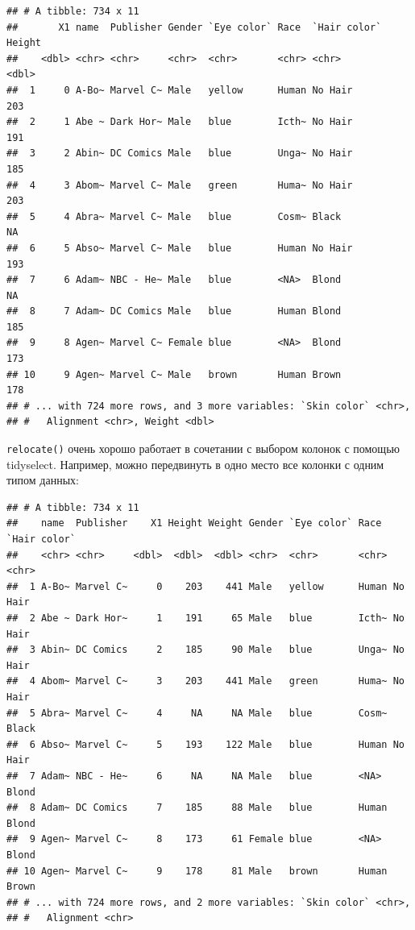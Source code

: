 \documentclass[
]{book}
\newenvironment{Shaded}{\begin{snugshade}}{\end{snugshade}}
\newcommand{\DataTypeTok}[1]{\textcolor[rgb]{0.13,0.29,0.53}{#1}}
\newcommand{\KeywordTok}[1]{\textcolor[rgb]{0.13,0.29,0.53}{\textbf{#1}}}
\newcommand{\NormalTok}[1]{#1}
\newcommand{\OperatorTok}[1]{\textcolor[rgb]{0.81,0.36,0.00}{\textbf{#1}}}
\newcommand{\StringTok}[1]{\textcolor[rgb]{0.31,0.60,0.02}{#1}}
\begin{document}
\begin{verbatim}
## # A tibble: 734 x 11
##       X1 name  Publisher Gender `Eye color` Race  `Hair color` Height
##    <dbl> <chr> <chr>     <chr>  <chr>       <chr> <chr>         <dbl>
##  1     0 A-Bo~ Marvel C~ Male   yellow      Human No Hair         203
##  2     1 Abe ~ Dark Hor~ Male   blue        Icth~ No Hair         191
##  3     2 Abin~ DC Comics Male   blue        Unga~ No Hair         185
##  4     3 Abom~ Marvel C~ Male   green       Huma~ No Hair         203
##  5     4 Abra~ Marvel C~ Male   blue        Cosm~ Black            NA
##  6     5 Abso~ Marvel C~ Male   blue        Human No Hair         193
##  7     6 Adam~ NBC - He~ Male   blue        <NA>  Blond            NA
##  8     7 Adam~ DC Comics Male   blue        Human Blond           185
##  9     8 Agen~ Marvel C~ Female blue        <NA>  Blond           173
## 10     9 Agen~ Marvel C~ Male   brown       Human Brown           178
## # ... with 724 more rows, and 3 more variables: `Skin color` <chr>,
## #   Alignment <chr>, Weight <dbl>
\end{verbatim}

\texttt{relocate()} очень хорошо работает в сочетании с выбором колонок с помощью tidyselect. Например, можно передвинуть в одно место все колонки с одним типом данных:

\begin{Shaded}
\end{Shaded}

\begin{verbatim}
## # A tibble: 734 x 11
##    name  Publisher    X1 Height Weight Gender `Eye color` Race  `Hair color`
##    <chr> <chr>     <dbl>  <dbl>  <dbl> <chr>  <chr>       <chr> <chr>       
##  1 A-Bo~ Marvel C~     0    203    441 Male   yellow      Human No Hair     
##  2 Abe ~ Dark Hor~     1    191     65 Male   blue        Icth~ No Hair     
##  3 Abin~ DC Comics     2    185     90 Male   blue        Unga~ No Hair     
##  4 Abom~ Marvel C~     3    203    441 Male   green       Huma~ No Hair     
##  5 Abra~ Marvel C~     4     NA     NA Male   blue        Cosm~ Black       
##  6 Abso~ Marvel C~     5    193    122 Male   blue        Human No Hair     
##  7 Adam~ NBC - He~     6     NA     NA Male   blue        <NA>  Blond       
##  8 Adam~ DC Comics     7    185     88 Male   blue        Human Blond       
##  9 Agen~ Marvel C~     8    173     61 Female blue        <NA>  Blond       
## 10 Agen~ Marvel C~     9    178     81 Male   brown       Human Brown       
## # ... with 724 more rows, and 2 more variables: `Skin color` <chr>,
## #   Alignment <chr>
\end{verbatim}
\end{document}
